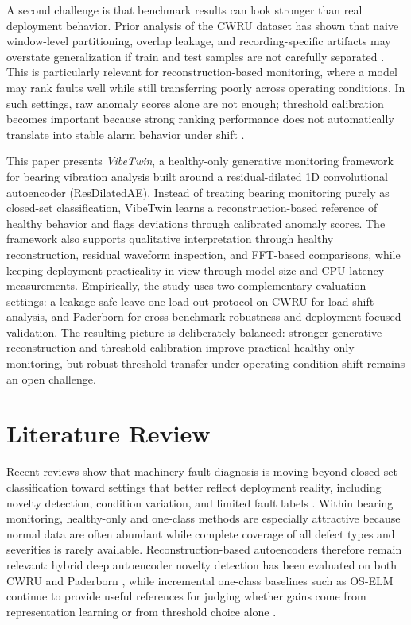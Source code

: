 A second challenge is that benchmark results can look stronger than real deployment behavior. Prior analysis of the CWRU dataset has shown that naive window-level partitioning, overlap leakage, and recording-specific artifacts may overstate generalization if train and test samples are not carefully separated \cite{hendriks2022benchmarking}. This is particularly relevant for reconstruction-based monitoring, where a model may rank faults well while still transferring poorly across operating conditions. In such settings, raw anomaly scores alone are not enough; threshold calibration becomes important because strong ranking performance does not automatically translate into stable alarm behavior under shift \cite{guo2017calibration}.

This paper presents \emph{VibeTwin}, a healthy-only generative monitoring framework for bearing vibration analysis built around a residual-dilated 1D convolutional autoencoder (ResDilatedAE). Instead of treating bearing monitoring purely as closed-set classification, VibeTwin learns a reconstruction-based reference of healthy behavior and flags deviations through calibrated anomaly scores. The framework also supports qualitative interpretation through healthy reconstruction, residual waveform inspection, and FFT-based comparisons, while keeping deployment practicality in view through model-size and CPU-latency measurements. Empirically, the study uses two complementary evaluation settings: a leakage-safe leave-one-load-out protocol on CWRU for load-shift analysis, and Paderborn for cross-benchmark robustness and deployment-focused validation. The resulting picture is deliberately balanced: stronger generative reconstruction and threshold calibration improve practical healthy-only monitoring, but robust threshold transfer under operating-condition shift remains an open challenge.

\section{Literature Review}

Recent reviews show that machinery fault diagnosis is moving beyond closed-set classification toward settings that better reflect deployment reality, including novelty detection, condition variation, and limited fault labels \cite{neupane2025review}. Within bearing monitoring, healthy-only and one-class methods are especially attractive because normal data are often abundant while complete coverage of all defect types and severities is rarely available. Reconstruction-based autoencoders therefore remain relevant: hybrid deep autoencoder novelty detection has been evaluated on both CWRU and Paderborn \cite{zhao2023hybridAE}, while incremental one-class baselines such as OS-ELM continue to provide useful references for judging whether gains come from representation learning or from threshold choice alone \cite{hao2023oselm}.

